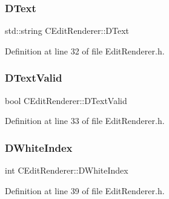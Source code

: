 \hypertarget{classCEditRenderer_af79bf047383c610d4fc24d937e29c594}{}\label{classCEditRenderer_af79bf047383c610d4fc24d937e29c594} 
\subsubsection{\texorpdfstring{D\+Text}{DText}}
{\footnotesize\ttfamily std\+::string C\+Edit\+Renderer\+::\+D\+Text\hspace{0.3cm}{\ttfamily [protected]}}



Definition at line 32 of file Edit\+Renderer.\+h.

\hypertarget{classCEditRenderer_ab4f0c6b356170adad1ad3b3e16573966}{}\label{classCEditRenderer_ab4f0c6b356170adad1ad3b3e16573966} 
\subsubsection{\texorpdfstring{D\+Text\+Valid}{DTextValid}}
{\footnotesize\ttfamily bool C\+Edit\+Renderer\+::\+D\+Text\+Valid\hspace{0.3cm}{\ttfamily [protected]}}



Definition at line 33 of file Edit\+Renderer.\+h.

\hypertarget{classCEditRenderer_aaa97fde55438f6ad02cbb365097a2274}{}\label{classCEditRenderer_aaa97fde55438f6ad02cbb365097a2274} 
\subsubsection{\texorpdfstring{D\+White\+Index}{DWhiteIndex}}
{\footnotesize\ttfamily int C\+Edit\+Renderer\+::\+D\+White\+Index\hspace{0.3cm}{\ttfamily [protected]}}



Definition at line 39 of file Edit\+Renderer.\+h.

\hypertarget{classCEditRenderer_ab203e5083f61d3575eb491f170c21d45}{}\label{classCEditRenderer_ab203e5083f61d3575eb491f170c21d45} 

